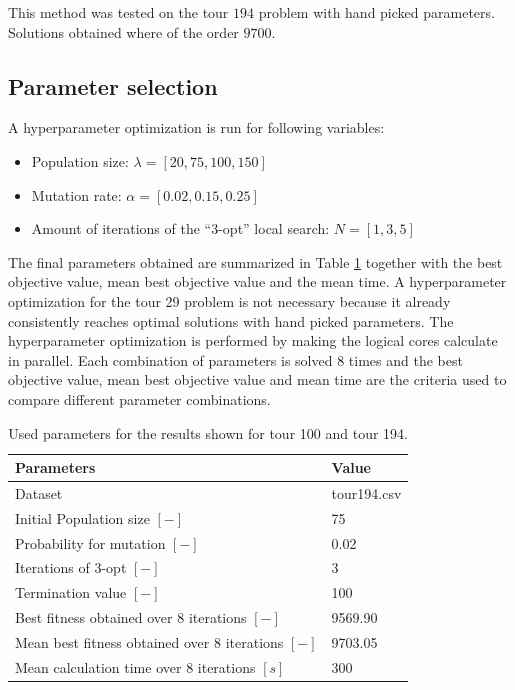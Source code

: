 \documentclass[a4paper,10pt]{article}
\newcommand{\ReplaceMe}[1]{{\color{blue}#1}}
\begin{document}
This method was tested on the tour $ 194 $ problem with hand picked parameters. Solutions obtained where of the order $ 9700 $.

\subsection{Parameter selection}

A hyperparameter optimization is run for following variables:
\begin{itemize}
	\item Population size: $ \lambda = [20,75,100,150] $
	\item Mutation rate: $ \alpha = [0.02, 0.15,0.25]$
	\item Amount of iterations of the ``3-opt'' local search: $ N = [1,3,5] $
\end{itemize}

The final parameters obtained are summarized in Table \ref{t:parameters} together with the best objective value, mean best objective value and the mean time. A hyperparameter optimization for the tour 29 problem is not necessary because it already consistently reaches optimal solutions with hand picked parameters. The hyperparameter optimization is performed by making the logical cores calculate in parallel. Each combination of parameters is solved $ 8 $ times and the best objective value, mean best objective value and mean time are the criteria used to compare different parameter combinations.

\begin{table}[h]
	\centering
	\begin{tabular}{|p{5.5cm}|p{2cm}|}
		\hline
		\textbf{Parameters} & \textbf{Value}\\ \hline
		Dataset  & tour194.csv\\ \hline
		Initial Population size $[-]$ & 75\\ \hline
		Probability for mutation $[-]$ & 0.02\\ \hline
		Iterations of 3-opt $ [-] $ & 3 \\ \hline
 		Termination value $[-]$ & 100\\ \hline
 		Best fitness obtained over $ 8 $ iterations $[-]$ & 9569.90\\ \hline
 		Mean best fitness obtained over $ 8 $ iterations $[-]$ & 9703.05\\ \hline
 		Mean calculation time over $ 8 $ iterations  $[s]$ & 300\\ \hline
	\end{tabular}
	\caption{Used parameters for the results shown for tour 100 and tour 194.}
	\label{t:parameters}
\end{table}
\end{document}
